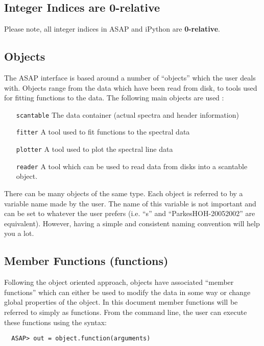 \documentclass[11pt]{article}
\newcommand{\cmd}[1]{{\tt #1}}
\begin{document}
\subsection {Integer Indices are 0-relative}

Please note, all integer indices in ASAP and iPython are {\bf 0-relative}.

\subsection{Objects}

The ASAP interface is based around a number of ``objects'' which the
user deals with. Objects range from the data which have been read from
disk, to tools used for fitting functions to the data. The following
main objects are used :

\begin{itemize}
  \item[\cmd{scantable}] The data container (actual spectra and header
    information)
  \item[\cmd{fitter}] A tool used to fit functions to the spectral data
  \item[\cmd{plotter}] A tool used to plot the spectral line data
  \item[\cmd{reader}] A tool which can be used to read data from disks
    into a scantable object.
\end{itemize}

There can be many objects of the same type. Each object is referred to
by a variable name made by the user. The name of this variable is not
important and can be set to whatever the user prefers (i.e. ``s'' and
``ParkesHOH-20052002'' are equivalent).  However, having a simple and
consistent naming convention will help you a lot.

\subsection{Member Functions (functions)}

Following the object oriented approach, objects have associated
``member functions'' which can either be used to modify the data in
some way or change global properties of the object. In this document
member functions will be referred to simply as functions. From the
command line, the user can execute these functions using the syntax:
\begin{verbatim}
  ASAP> out = object.function(arguments)
\end{verbatim}
\end{document}
